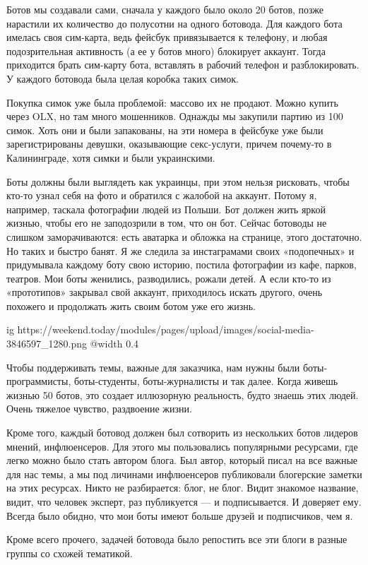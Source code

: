 \begin{itemize}
\begin{multicols}{2}
Ботов мы создавали сами, сначала у каждого было около 20 ботов, позже нарастили
их количество до полусотни на одного ботовода. Для каждого бота имелась своя
сим-карта, ведь фейсбук привязывается к телефону, и любая подозрительная
активность (а ее у ботов много) блокирует аккаунт. Тогда приходится брать
сим-карту бота, вставлять в рабочий телефон и разблокировать. У каждого
ботовода была целая коробка таких симок.

Покупка симок уже была проблемой: массово их не продают. Можно купить через
OLX, но там много мошенников. Однажды мы закупили партию из 100 симок. Хоть они
и были запакованы, на эти номера в фейсбуке уже были зарегистрированы девушки,
оказывающие секс-услуги, причем почему-то в Калининграде, хотя симки и были
украинскими.

Боты должны были выглядеть как украинцы, при этом нельзя рисковать, чтобы
кто-то узнал себя на фото и обратился с жалобой на аккаунт. Потому я, например,
таскала фотографии людей из Польши. Бот должен жить яркой жизнью, чтобы его не
заподозрили в том, что он бот. Сейчас ботоводы не слишком заморачиваются: есть
аватарка и обложка на странице, этого достаточно. Но таких и быстро банят. Я же
следила за инстаграмами своих «подопечных» и придумывала каждому боту свою
историю, постила фотографии из кафе, парков, театров. Мои боты женились,
разводились, рожали детей. А если кто-то из «прототипов» закрывал свой аккаунт,
приходилось искать другого, очень похожего и продолжать жить своим ботом уже
его жизнь.

\ifcmt
  ig https://weekend.today/modules/pages/upload/images/social-media-3846597_1280.png
  @width 0.4
\fi

Чтобы поддерживать темы, важные для заказчика, нам нужны были
боты-программисты, боты-студенты, боты-журналисты и так далее. Когда живешь
жизнью 50 ботов, это создает иллюзорную реальность, будто знаешь этих людей.
Очень тяжелое чувство, раздвоение жизни.

Кроме того, каждый ботовод должен был сотворить из нескольких ботов лидеров
мнений, инфлюенсеров. Для этого мы пользовались популярными ресурсами, где
легко можно было стать автором блога. Был автор, который писал на все важные
для нас темы, а мы под личинами инфлюенсеров публиковали блогерские заметки на
этих ресурсах. Никто не разбирается: блог, не блог. Видит знакомое название,
видит, что человек эксперт, раз публикуется — и подписывается. И доверяет ему.
Всегда было обидно, что мои боты имеют больше друзей и подписчиков, чем я.

Кроме всего прочего, задачей ботовода было репостить все эти блоги в разные
группы со схожей тематикой.


\end{multicols}
\end{itemize}
